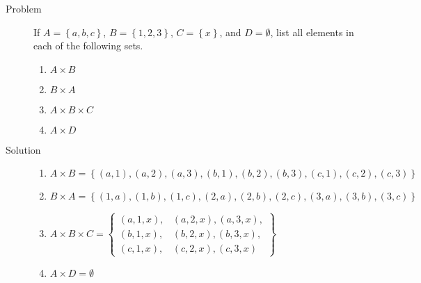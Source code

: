 \begin{description}
\item[Problem] If $A = \left\{a, b, c\right\}$, $B = \left\{1, 2, 3\right\}$,
$C = \left\{x\right\}$, and $D = \emptyset$, list all elements in each of the
following sets.

\begin{multicols}{2}
\begin{enumerate}
\item $A \times B$
\item $B \times A$
\item $A \times B \times C$
\item $A \times D$
\end{enumerate}
\end{multicols}

\item[Solution]

\begin{enumerate}
\item $A \times B = \left\{
(a, 1),
(a, 2),
(a, 3),
(b, 1),
(b, 2),
(b, 3),
(c, 1),
(c, 2),
(c, 3)
\right\}$
\item $B \times A = \left\{
(1, a),
(1, b),
(1, c),
(2, a),
(2, b),
(2, c),
(3, a),
(3, b),
(3, c)
\right\}$
\item $
A \times B \times C = \left\{
\begin{aligned}
(a, 1, x),&
(a, 2, x),
(a, 3, x),\\
(b, 1, x),&
(b, 2, x),
(b, 3, x),\\
(c, 1, x),&
(c, 2, x),
(c, 3, x)
\end{aligned}
\right\}$
\item $A \times D = \emptyset$
\end{enumerate}

\end{description}
